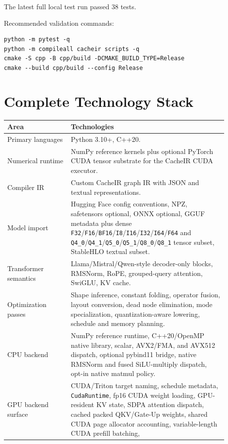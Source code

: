 \documentclass[11pt]{article}
\begin{document}
The latest full local test run passed 38 tests.

Recommended validation commands:

\begin{lstlisting}
python -m pytest -q
python -m compileall cacheir scripts -q
cmake -S cpp -B cpp/build -DCMAKE_BUILD_TYPE=Release
cmake --build cpp/build --config Release
\end{lstlisting}

\section{Complete Technology Stack}

\begin{longtable}{p{0.26\linewidth}p{0.64\linewidth}}
\toprule
\textbf{Area} & \textbf{Technologies} \\
\midrule
Primary languages & Python 3.10+, C++20. \\
Numerical runtime & NumPy reference kernels plus optional PyTorch CUDA tensor
substrate for the CacheIR CUDA executor. \\
Compiler IR & Custom CacheIR graph IR with JSON and textual representations. \\
Model import & Hugging Face config conventions, NPZ, safetensors optional,
ONNX optional, GGUF metadata plus dense \texttt{F32}/\texttt{F16}/\texttt{BF16}/\texttt{I8}/\texttt{I16}/\texttt{I32}/\texttt{I64}/\texttt{F64} and
\texttt{Q4\_0}/\texttt{Q4\_1}/\texttt{Q5\_0}/\texttt{Q5\_1}/\texttt{Q8\_0}/\texttt{Q8\_1} tensor subset, StableHLO textual subset. \\
Transformer semantics & Llama/Mistral/Qwen-style decoder-only blocks,
RMSNorm, RoPE, grouped-query attention, SwiGLU, KV cache. \\
Optimization passes & Shape inference, constant folding, operator fusion,
layout conversion, dead node elimination, mode specialization, quantization-aware
lowering, schedule and memory planning. \\
CPU backend & NumPy reference runtime, C++20/OpenMP native library, scalar,
AVX2/FMA, and AVX512 dispatch, optional pybind11 bridge, native RMSNorm and
fused SiLU-multiply dispatch, opt-in native matmul policy. \\
GPU backend surface & CUDA/Triton target naming, schedule metadata,
\texttt{CudaRuntime}, fp16 CUDA weight loading, GPU-resident KV state, SDPA
attention dispatch, cached packed QKV/Gate-Up weights, shared CUDA page
allocator accounting, variable-length CUDA prefill batching,

\end{longtable}
\end{document}
